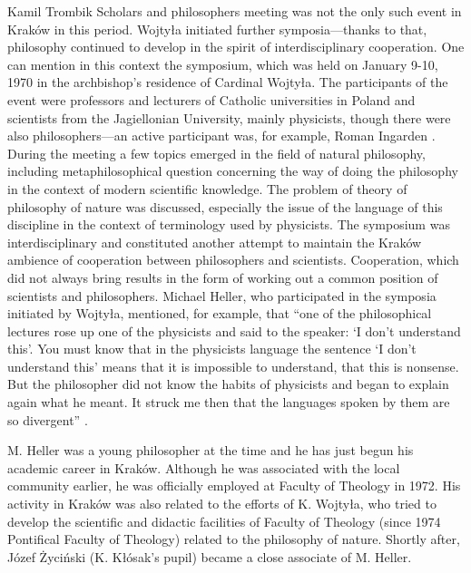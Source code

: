 \begin{artengenv}{Kamil Trombik}
Scholars and philosophers meeting was not the only such event in Kraków in this period. Wojtyła initiated further
symposia---thanks to that, philosophy continued to develop in the spirit of interdisciplinary cooperation. One can
mention in this context the symposium, which was held on January 9-10, 1970 in the archbishop's residence of Cardinal
Wojtyła. The participants of the event were professors and lecturers of Catholic universities in Poland and scientists
from the Jagiellonian University, mainly physicists, though there were also philosophers---an active participant was, for
example, Roman Ingarden
\parencite{heller_poczatki_2006}.
During the meeting a few topics emerged in
the field of natural philosophy, including metaphilosophical question concerning the way of doing the philosophy in the
context of modern scientific knowledge. The problem of theory of philosophy of nature was discussed, especially the
issue of the language of this discipline in the context of terminology used by physicists. The symposium was
interdisciplinary and constituted another attempt to maintain the Kraków ambience of cooperation between philosophers
and scientists. Cooperation, which did not always bring results in the form of working out a common position of
scientists and philosophers. Michael Heller, who participated in the symposia initiated by Wojtyła, mentioned, for
example, that ``one of the philosophical lectures rose up one of the physicists and said to the speaker: `I don't
understand this'. You must know that in the physicists language the sentence `I don't understand this' means that it is
impossible to understand, that this is nonsense. But the philosopher did not know the habits of physicists and began to
explain again what he meant. It struck me then that the languages spoken by them are so
divergent''
\parencite[pp.227--228]{heller_wierze_2016}.

M. Heller was a young philosopher at the time and he has just begun his academic career in Kraków. Although he was
associated with the local community earlier, he was officially employed at Faculty of Theology in 1972. His activity in
Kraków was also related to the efforts of K. Wojtyła, who tried to develop the scientific and didactic facilities of
Faculty of Theology (since 1974 Pontifical Faculty of Theology) related to the philosophy of nature. Shortly after,
Józef Życiński (K. Kłósak's pupil) became a close associate of M. Heller.


\end{artengenv}
